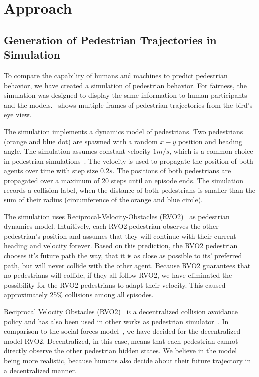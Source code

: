 
\section{Approach}\label{sec:approach}

\subsection{Generation of Pedestrian Trajectories in Simulation}
To compare the capability of humans and machines to predict pedestrian behavior, we have created a simulation of pedestrian behavior. For fairness, the simulation was designed to display the same information to human participants and the models.~ shows multiple frames of pedestrian trajectories from the bird's eye view.

The simulation implements a dynamics model of pedestrians. Two pedestrians (orange and blue dot) are spawned with a random $x-y$ position and heading angle. The simulation assumes constant velocity $1m/s$, which is a common choice in pedestrian simulations~\cite{Sean2014}. The velocity is used to propagate the position of both agents over time with step size $0.2s$. The positions of both pedestrians are propagated over a maximum of 20 steps until an episode ends. The simulation records a collision label, when the distance of both pedestrians is smaller than the sum of their radius (circumference of the orange and blue circle). 

The simulation uses Reciprocal-Velocity-Obstacles (RVO2)~\cite{Vandenberg2008} as pedestrian dynamics model. Intuitively, each RVO2 pedestrian observes the other pedestrian's position and assumes that they will continue with their current heading and velocity forever. Based on this prediction, the RVO2 pedestrian chooses it's future path the way, that it is as close as possible to its' preferred path, but will never collide with the other agent. Because RVO2 guarantees that no pedestrians will collide, if they all follow RVO2, we have eliminated the possibility for the RVO2 pedestrians to adapt their velocity. This caused approximately 25\% collisions among all episodes.

Reciprocal Velocity Obstacles (RVO2)~\cite{Vandenberg2008} is a decentralized collision avoidance policy and has also been used in other works as pedestrian simulator~\cite{Bera2017}. In comparison to the social forces model~\cite{Helbing1998}, we have decided for the decentralized model RVO2. Decentralized, in this case, means that each pedestrian cannot directly observe the other pedestrian hidden states. We believe in the model being more realistic, because humans also decide about their future trajectory in a decentralized manner. 

